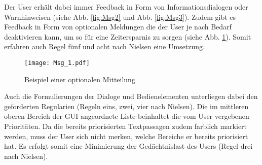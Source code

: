 Der User erh{\"a}lt dabei immer Feedback in Form von
Informationsdialogen oder Warnhinweisen (siehe Abb. \ref{fig:Msg2} und Abb.
\ref{fig:Msg3}). Zudem gibt es Feedback in Form von optionalen Meldungen die der
User je nach Bedarf deaktivieren kann, um so f{\"u}r eine Zeitersparnis zu
sorgen (siehe Abb. \ref{fig:Msg1}). Somit erfahren auch Regel f{\"u}nf und acht
nach Nielsen eine Umsetzung.

\begin{figure}[H]
\centering
\texttt{[image: Msg\_1.pdf]}
\caption{Beispiel einer optionalen Mitteilung}
\label{fig:Msg1}
\end{figure}

Auch die Formulierungen der Dialoge und Bedienelementen unterliegen dabei den
geforderten Regularien (Regeln eins, zwei, vier nach Nielsen). Die im mittleren
oberen Bereich der \gls{GUI} angeordnete Liste beinhaltet die vom User vergebenen
Priorit{\"a}ten. Da die bereits priorisierten Textpassagen zudem farblich
markiert werden, muss der User sich nicht merken, welche Bereiche er bereits
priorisiert hat. Es erfolgt somit eine Minimierung der Ged{\"a}chtnislast des
Users (Regel drei nach Nielsen).

